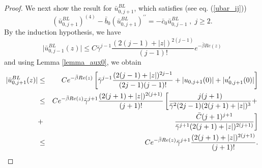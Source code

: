 \documentclass[12pt]{article}
\begin{document}
\begin{proof}
%
We next show the result for $\bar{u}^{BL}_{0,j+1}$, which satisfies (see eq. (\ref{ubar_ij}))
\[
\left(\bar{u}^{BL}_{0,j+1}\right)^{(4)}-\bar{b}_{0}\left(\bar{u}^{BL}_{0,j+1}\right)^{\prime \prime }=-\bar{c}_{0}\bar{u}^{BL}_{0,j-1} \; , \; j\geq 2.
\]
%
By the induction hypothesis, we have
%
\[
\vert \bar{u}^{BL}_{0,j-1} (z) \vert \leq C \bar{\gamma }^{j-1} \frac{(2(j-1)+|z|)^{2(j-1)}}{(j-1)!} e^{-\bar{\beta} Re(z)}
\]
and using Lemma \ref{lemma_aux0}, we obtain
%
\begin{eqnarray*}
\vert \bar{u}^{BL}_{0,j+1} (z) \vert &\leq& C e^{-\bar{\beta} Re(z)} \left[ \bar{\gamma}^{j-1} \frac{(2(j-1)+|z|)^{2j-1}}{(2j-1) (j-1)!} +
|u_{0,j+1}(0)| + |u'_{0,j+1}(0)| \right]  \notag \\
&\leq& C e^{-\bar{\beta} Re(z)} \bar{\gamma}^{j+1} \frac{(2(j+1)+|z|)^{2(j+1)}}{(j+1)!} \left[ \frac{j(j+1)}{\bar{\gamma}^2 (2j-1) (2(j+1)+|z|)^3} + \right. \\
&+& \left. \frac{\bar{C} (j+1)^{j+1}}{\bar{\gamma}^{j+1} (2(j+1)+|z|)^{2(j+1)}} \right] \\
&\leq& C e^{-\bar{\beta} Re(z)} \bar{\gamma}^{j+1} \frac{(2(j+1)+|z|)^{2(j+1)}}{(j+1)!}.
\end{eqnarray*}
%


\end{proof}
\end{document}
